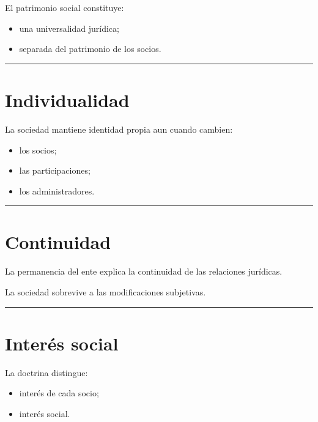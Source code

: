 \documentclass[
  spanish,
  letterpaper,
  DIV=11,
  numbers=noendperiod]{scrartcl}
\providecommand{\tightlist}{%
  \setlength{\itemsep}{0pt}\setlength{\parskip}{0pt}}
\begin{document}
El patrimonio social constituye:

\begin{itemize}
\tightlist
\item
  una universalidad jurídica;
\item
  separada del patrimonio de los socios.
\end{itemize}

\begin{center}\rule{0.5\linewidth}{0.5pt}\end{center}

\section{Individualidad}\label{individualidad}

La sociedad mantiene identidad propia aun cuando cambien:

\begin{itemize}
\tightlist
\item
  los socios;
\item
  las participaciones;
\item
  los administradores.
\end{itemize}

\begin{center}\rule{0.5\linewidth}{0.5pt}\end{center}

\section{Continuidad}\label{continuidad}

La permanencia del ente explica la continuidad de las relaciones
jurídicas.

La sociedad sobrevive a las modificaciones subjetivas.

\begin{center}\rule{0.5\linewidth}{0.5pt}\end{center}

\section{Interés social}\label{interuxe9s-social}

La doctrina distingue:

\begin{itemize}
\tightlist
\item
  interés de cada socio;
\item
  interés social.
\end{itemize}
\end{document}
